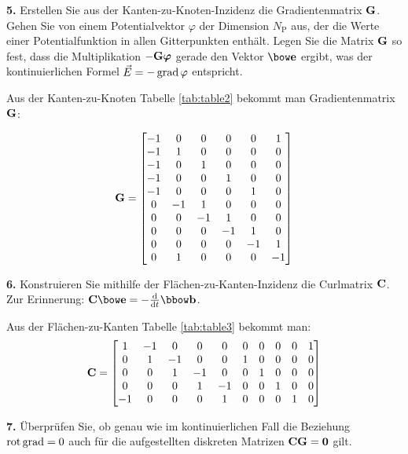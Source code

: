 \documentclass[Protokollheft.tex]{subfiles}
\begin{document}
        \begin{framed}
	\noindent \textbf{5.} Erstellen Sie aus der Kanten-zu-Knoten-Inzidenz die Gradientenmatrix $\mathbf{G}$.
                    Gehen Sie von einem Potentialvektor {\boldmath $\varphi$}
                    der Dimension $N_\text{P}$ aus, der die Werte einer
                    Potentialfunktion in allen Gitterpunkten enthält. Legen Sie
                    die Matrix $\mathbf{G}$ so fest, dass die Multiplikation $-\mbox{\boldmath
                    $\mathbf{G} \varphi$}$ gerade den Vektor $\efit$ ergibt, was der
                    kontinuierlichen Formel $\vec{E}=-\operatorname{grad}\varphi$ entspricht.\label{exer:gradfit}
\end{framed}
\noindent
Aus  der Kanten-zu-Knoten Tabelle \ref{tab:table2} bekommt man Gradientenmatrix $\mathbf{G}$:

$$ \gradfit = \begin{bmatrix}
-1 & 0 & 0 & 0 & 0 & 1\\
-1 & 1 & 0 & 0 & 0 & 0\\
-1 & 0 & 1 & 0 & 0 & 0\\
-1 & 0 & 0 & 1 & 0 & 0\\
-1 & 0 & 0 & 0 & 1 & 0\\
0 & -1 & 1 & 0 & 0 & 0\\
0 & 0 & -1 & 1 & 0 & 0\\
0 & 0 & 0 & -1 & 1 & 0\\
0 & 0 & 0 & 0 & -1 & 1\\
0 & 1 & 0 & 0 & 0 & -1\\

\end{bmatrix} $$


        \begin{framed}
	\noindent \textbf{6.} Konstruieren Sie mithilfe der Flächen-zu-Kanten-Inzidenz die Curlmatrix $\mathbf{C}$.\\
              Zur Erinnerung: $\curlfit \efit = - \frac{\text{d}}{\text{d}t} \bfit$.\label{exer:curlfit}
\end{framed}
\noindent
Aus der Flächen-zu-Kanten Tabelle \ref{tab:table3} bekommt man:
$$ \mathbf{C} = \begin{bmatrix}
1 & -1 & 0 & 0 & 0 & 0 & 0 & 0 & 0 & 1\\
0 & 1 & -1 & 0 & 0 & 1 & 0 & 0 & 0 & 0\\
0 & 0 & 1 & -1 & 0 & 0 & 1 & 0 & 0 & 0\\
0 & 0 & 0 & 1 & -1 & 0 & 0 & 1 & 0 & 0\\
-1 & 0 & 0 & 0 & 1 & 0 & 0 & 0 & 1 & 0 
\end{bmatrix} $$
        \begin{framed}
	\noindent \textbf{7.} Überprüfen Sie, ob genau wie im kontinuierlichen Fall die Beziehung $\operatorname{rot}\operatorname{grad}=0$ auch für die aufgestellten diskreten Matrizen $\mathbf{C}\mathbf{G}={\textbf{0}}$ gilt.\label{exer:rotgradZero}
\end{framed}
\end{document}
